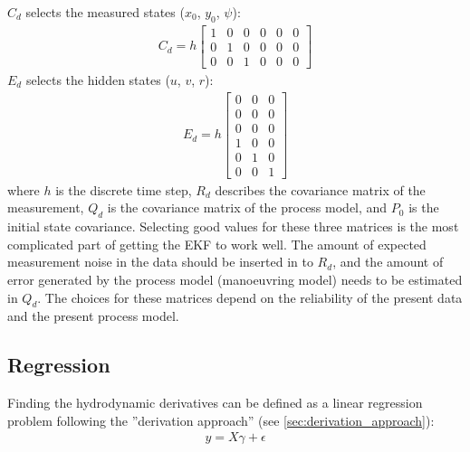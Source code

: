 \sphinxAtStartPar
\(C_d\) selects the measured states (\(x_0\), \(y_0\), \(\psi\)):
\begin{equation}\label{equation:04.01_EK:eqcd}
\begin{split}\displaystyle C_{d} = h \left[\begin{matrix}1 & 0 & 0 & 0 & 0 & 0\\0 & 1 & 0 & 0 & 0 & 0\\0 & 0 & 1 & 0 & 0 & 0\end{matrix}\right]\end{split}
\end{equation}
\sphinxAtStartPar
\(E_d\) selects the hidden states (\(u\), \(v\), \(r\)):
\begin{equation}\label{equation:04.01_EK:eqed}
\begin{split}\displaystyle E_{d} = h \left[\begin{matrix}0 & 0 & 0\\0 & 0 & 0\\0 & 0 & 0\\1 & 0 & 0\\0 & 1 & 0\\0 & 0 & 1\end{matrix}\right]\end{split}
\end{equation}
\sphinxAtStartPar
where \(h\) is the discrete time step, \(R_d\) describes the covariance matrix of the measurement, \(Q_d\) is the covariance matrix of the process model, and \(P_0\) is the initial state covariance.
Selecting good values for these three matrices is the most complicated part of getting the EKF to work well. The amount of expected measurement noise in the data should be inserted in to \(R_d\), and the amount of error generated by the process model (manoeuvring model) needs to be estimated in \(Q_d\). The choices for these matrices depend on the reliability of the present data and the present process model.

\subsection{Regression}
Finding the hydrodynamic derivatives can be defined as a linear regression problem following the ''derivation approach'' (see \autoref{sec:derivation_approach}):
\begin{equation}\label{equation:03.01_inverse_dynamics:eqregression}
\begin{split}y = X\gamma + \epsilon\end{split}
\end{equation}

